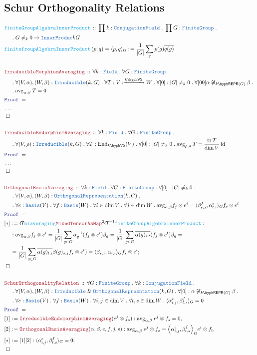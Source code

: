 \documentclass[12pt]{scrartcl}%
\newcommand{\TYPE}[1]{\textcolor{NavyBlue}{\mathtt{#1}}}%
\newcommand{\FUNC}[1]{\textcolor{Cerulean}{\mathtt{#1}}}%
\newcommand{\LOGIC}[1]{\textcolor{Blue}{\mathtt{#1}}}%
\newcommand{\THM}[1]{\textcolor{Maroon}{\mathtt{#1}}}%
\renewcommand{\.}{\; . \;} %
\newcommand{\de}{: \kern 0.1pc =} %
\newcommand{\Act}[1]{\left( #1 \right)} %
\newcommand{\Theorem}[2]{& \THM{#1} \, :: \, #2 \\ & \Proof = \\ } %
\newcommand{\DeclareFunc}[2]{& \FUNC{#1} \, :: \, #2 \\}%
\newcommand{\DefineNamedFunc}[4]{&  \FUNC{#1}\Act{#2} = #3 \de #4 \\}%
\newcommand{\NewLine}{\\ & \kern 1pc}%
\newcommand{\Page}[1]{ \begin{align*} #1 \end{align*}  }%
\newcommand{ \bd }{ \ByDef }%
\newcommand{\NoProof}{ & \ldots \\ \EndProof}%
\renewcommand{\And}{\; \& \;}%
\DeclareMathOperator*{\id}{id}%
\newcommand{\End}{\mathrm{End}}%
\newcommand{\Say}[3]{& #1 \de #2 : #3, \\} %
\newcommand{\Conclude}[3]{& #1 \de #2 : #3; \\}%
\newcommand{\QED}{\; \square} %
\newcommand{\EndProof}{& \QED \\} %
\newcommand{\ByDef}{\rotatebox[origin=c]{-180}{$D$}}%
\newcommand{\Proof}{\LOGIC{Proof} \; } %
\newcommand{\Arrow}[1]{\xrightarrow{#1}}%
\newcommand{\FG}{\TYPE{FiniteGroup}} %
\newcommand{\REPR}[2]{#1\hyph\mathsf{REPR}\left(#2\right)}
\newcommand{\Basis}{\TYPE{Basis}} %
\DeclareMathOperator{\tr}{tr}     %
\newcommand{\VS}[1]{#1\hyph\mathsf{VS}} %
\newcommand{\Field}{\TYPE{Field}}
\begin{document}
\subsection{Schur Orthogonality Relations}
\Page{
	\DeclareFunc{finiteGroupAlgebraInnerProduct}
	{
		\prod k : \TYPE{ConjugationField} \.
		\prod G : \FG \.
		\NewLine \. 
		G \neq_k 0 \to \TYPE{InnerProduc}{kG}
	}
	\DefineNamedFunc{finitefroupAlgebraInnerProduct}
	{p,q}{ \langle p, q \rangle_G   }
	{
	  \frac{1}{|G|} \sum_g p(g) \overline{q(g)}
	}
	\\
	\Theorem{IrreducibleMorphismAveraging}
	{
		\forall k : \Field \.
		\forall G : \FG \. \NewLine \.
		\forall (V,\alpha),(W,\beta) : \TYPE{Irreducible}(k,G) \.
		\forall T : V : \Arrow{\VS{k}} W \.
		\forall [0] : |G| \neq_k 0 \.
		\forall [00] \alpha \not \cong_{\REPR{k}{G}} \beta \.
		\NewLine \.
		\mathrm{avg}_{\alpha,\beta}\; T = 0
	}
	\NoProof
	\\
	\Theorem{IrreducibleEndorphismAveraging}
	{
		\forall k : \Field \.
		\forall G : \FG \. \NewLine \.
		\forall (V,\rho) : \TYPE{Irreducible}(k,G) \.
		\forall T :  \End_{\VS{k}}(V)  \.
		\forall [0] : |G| \neq_k 0 \.
		\mathrm{avg}_{\rho,\rho}\; T =  \frac{\tr T}{\dim V} \id
	}
	\NoProof
	\\
	\Theorem{OrthogonalBasisAveraging}
	{
		\forall k : \Field \.
		\forall G : \FG \. 
		\forall [0] : |G| \neq_k 0 \.
		\NewLine \.
		\forall (V,\alpha),(W,\beta) : 
		\TYPE{OrthogonalRepresentation}(k,G) \.
		\NewLine \. 
		\forall e : \Basis(V) \.
		\forall f : \Basis(W) \. 
		\forall i \in \dim V \.
		\forall j \in \dim W \.
		\mathrm{avg}_{\alpha,\beta} f_j \otimes e^i = 
		\langle \beta_{s,j}^f,\alpha_{t,i}^e \rangle_G  
		f_s \otimes e^t
	}
	\Conclude{[*]}{
		\bd\FUNC{biaveraging}
		\THM{MixedTensorAsMap}^2
		\bd^{-1} \FUNC{finiteGroupAlgebraInnerProduct}
	}
	{
		\NewLine : 
		\mathrm{avg}_{\alpha,\beta} f_j \otimes e^i =	
		\frac{1}{|G|} \sum_{g \in G} 
		\alpha^{-1}_g (f_j \otimes e^i)  \beta_g  =
		\frac{1}{|G|} \sum_{g \in G} 
		\overline{\alpha(g)_{i,t}} (f_j \otimes e^t)  \beta_g  =
		\NewLine = 
		\frac{1}{|G|} \sum_{g \in G} 
		\overline{\alpha(g)_{t,i}}\beta(g)_{s,j} f_s \otimes e^t)=
		\langle \beta_{s,j} ,\alpha_{t,i}\rangle_G f_s \otimes e^t
	}
	\EndProof
	\\
	\Theorem{SchurOrthogonalityRelation}
	{
		\forall G : \FG \.
		\forall k : \TYPE{ConjugationField} \. \NewLine \. 
		\forall (V,\alpha),(W,\beta) : 
		\TYPE{Irreducible} \And \TYPE{OrthogonalRepresntation}
		(k,G) \.
		\forall [0] : \alpha \not \cong_{\REPR{k}{G}} \beta  \.
		\NewLine \. 
		\forall e : \Basis(V) \.
		\forall f : \Basis(W) \.
		\forall i,j \in \dim V \.
		\forall t,s \in \dim W \.
		\langle \alpha_{i,j}^e, \beta_{t,s}^f \rangle_G = 0 
	}
	\Say{[1]}{\THM{IrreducibleEndomorphismAveraging}(e^j \otimes f_s)}
	{ \mathrm{avg}_{\alpha,\beta} \;e^j \otimes f_s = 0  }
	\Say{[2]}{\THM{OrthogonalBasisAveraging}(\alpha,\beta,e,f,j,s)}
	{
		\mathrm{avg}_{\alpha,\beta} \; e^j \otimes f_s =
		\Big\langle \alpha_{i,j}^e, \beta_{t,s}^f  \Big\rangle_G 
		e^i \otimes f_t
	}
	\Conclude{[*]}
	{
		[1][2]
	}
	{
		\langle \alpha_{i,j}^e, \beta_{t,s}^f \rangle_G = 0
	}
	\EndProof
}
\end{document}
